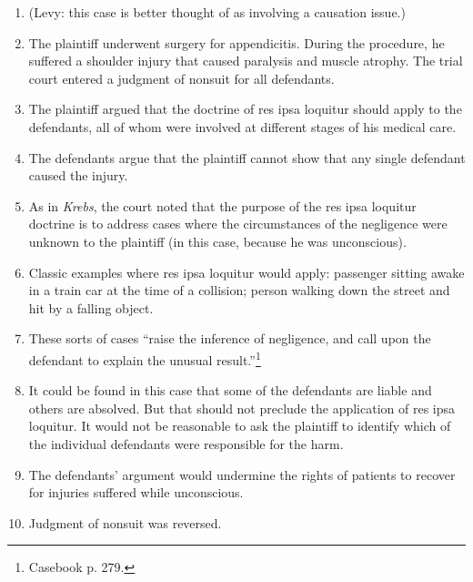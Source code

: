 \begin{enumerate}
    \item (Levy: this case is better thought of as involving a causation 
    issue.)
    \item The plaintiff underwent surgery for appendicitis. During the 
    procedure, he suffered a shoulder injury that caused paralysis and muscle 
    atrophy. The trial court entered a judgment of nonsuit for all defendants.
    \item The plaintiff argued that the doctrine of res ipsa loquitur should 
    apply to the defendants, all of whom were involved at different stages of 
    his medical care.
    \item The defendants argue that the plaintiff cannot show that any single 
    defendant caused the injury.
    \item As in \emph{Krebs}, the court noted that the purpose of the res ipsa 
    loquitur doctrine is to address cases where the circumstances of the 
    negligence were unknown to the plaintiff (in this case, because he was 
    unconscious).
    \item Classic examples where res ipsa loquitur would apply: passenger 
    sitting awake in a train car at the time of a collision; person walking 
    down the street and hit by a falling object.
    \item These sorts of cases ``raise the inference of negligence, and call 
    upon the defendant to explain the unusual result.''\footnote{Casebook p. 
    279.}
    \item It could be found in this case that some of the defendants are 
    liable and others are absolved. But that should not preclude the 
    application of res ipsa loquitur. It would not be reasonable to ask the 
    plaintiff to identify which of the individual defendants were responsible 
    for the harm.
    \item The defendants' argument would undermine the rights of patients to 
    recover for injuries suffered while unconscious.
    \item Judgment of nonsuit was reversed.
\end{enumerate}
